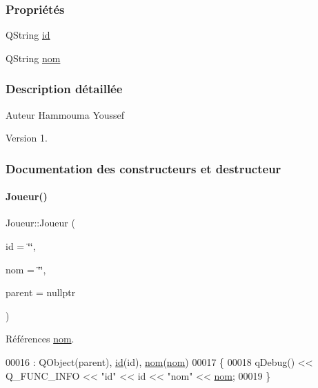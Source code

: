 \subsubsection*{Propriétés}
\begin{DoxyCompactItemize}
\item 
Q\+String \hyperlink{class_joueur_a99c42cd3be344a1348064aca8619c82b}{id}
\item 
Q\+String \hyperlink{class_joueur_ab06d7f1e6b482299bb03919e0cd2166d}{nom}
\end{DoxyCompactItemize}


\subsubsection{Description détaillée}
\begin{DoxyAuthor}{Auteur}
Hammouma Youssef
\end{DoxyAuthor}
\begin{DoxyVersion}{Version}
1. 
\end{DoxyVersion}


\subsubsection{Documentation des constructeurs et destructeur}
\mbox{\label{class_joueur_a36774818f07cf7a06681250dca1fdd81}} 
\paragraph{\texorpdfstring{Joueur()}{Joueur()}}
{\footnotesize\ttfamily Joueur\+::\+Joueur (\begin{DoxyParamCaption}\item[{Q\+String}]{id = {\ttfamily \char`\"{}\char`\"{}},  }\item[{Q\+String}]{nom = {\ttfamily \char`\"{}\char`\"{}},  }\item[{Q\+Object $\ast$}]{parent = {\ttfamily nullptr} }\end{DoxyParamCaption})\hspace{0.3cm}{\ttfamily [explicit]}}



Références \hyperlink{class_joueur_ab06d7f1e6b482299bb03919e0cd2166d}{nom}.


\begin{DoxyCode}
00016                                                        : QObject(parent), \hyperlink{class_joueur_a99c42cd3be344a1348064aca8619c82b}{id}(\textcolor{keywordtype}{id}), 
      \hyperlink{class_joueur_ab06d7f1e6b482299bb03919e0cd2166d}{nom}(\hyperlink{class_joueur_ab06d7f1e6b482299bb03919e0cd2166d}{nom})
00017 \{
00018     qDebug() << Q\_FUNC\_INFO << \textcolor{stringliteral}{"id"} << \textcolor{keywordtype}{id} << \textcolor{stringliteral}{"nom"} << \hyperlink{class_joueur_ab06d7f1e6b482299bb03919e0cd2166d}{nom};
00019 \}
\end{DoxyCode}


